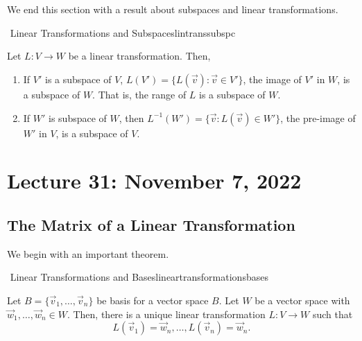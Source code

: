         \vphantom
        \\
        \\
        We end this section with a result about subspaces and linear transformations.
        \begin{theorem}{\Stop\,\,Linear Transformations and Subspaces}{lintranssubspc}

            Let \(L:V\to W\) be a linear transformation. Then,
            \begin{enumerate}
                \item If \(V'\) is a subspace of \(V\), \(L(V')=\{L(\vec{v}):\vec{v}\in V'\}\), the image of \(V'\) in \(W\), is a subspace of \(W\). That is, the range of \(L\) is a subspace of \(W\).
                \item If \(W'\) is subspace of \(W\), then \(L^{-1}(W')=\{\vec{v}:L(\vec{v})\in W'\}\), the pre-image of \(W'\) in \(V\), is a subspace of \(V\).
            \end{enumerate}
            
        \end{theorem}
        
\section{Lecture 31: November 7, 2022}

    \subsection{The Matrix of a Linear Transformation}

        We begin with an important theorem.
        \begin{theorem}{\Stop\,\,Linear Transformations and Bases}{lineartransformationsbases}

            Let \(B=\{\vec{v}_1,\ldots,\vec{v}_n\}\) be basis for a vector space \(B\). Let \(W\) be a vector space with \(\vec{w}_1,\ldots,\vec{w}_n\in W\). Then, there is a unique linear transformation \(L:V\to W\) such that
            \begin{equation*}
                L(\vec{v}_1)=\vec{w}_n,\ldots,L(\vec{v}_n)=\vec{w}_n.
            \end{equation*}
            
        \end{theorem}